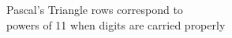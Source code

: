 \documentclass[preview]{standalone}
\begin{document}
\begin{center}
Pascal's Triangle rows correspond to\\powers of 11 when digits are carried properly
\end{center}
\end{document}

